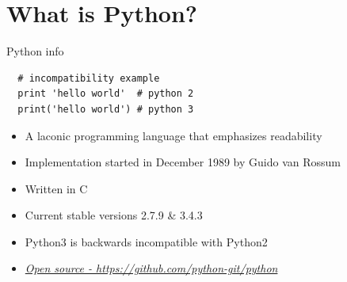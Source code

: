 \documentclass{bredelebeamer}
\begin{document}
\section{What is Python?}

\begin{frame}[fragile]{Python info}

  \begin{lstlisting}
  # incompatibility example
  print 'hello world'  # python 2
  print('hello world') # python 3
  \end{lstlisting}

  \begin{itemize}
    \item A laconic programming language that emphasizes readability
    \item Implementation started in December 1989 by Guido van Rossum
    \item Written in C
    \item Current stable versions 2.7.9 \& 3.4.3
    \item Python3 is backwards incompatible with Python2
    \item \href{https://github.com/python-git/python}{\emph{Open source - https://github.com/python-git/python}}
  \end{itemize}


\end{frame}
\end{document}
